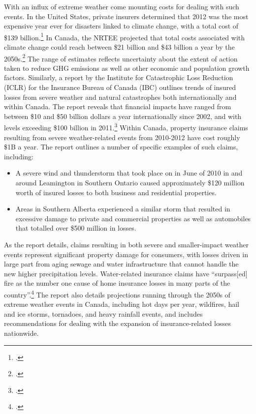 With an influx of extreme weather come mounting costs for dealing with such events. 
In the United States, private insurers determined that 2012 was the most expensive year ever for disasters linked to climate change, with a total cost of \$139 billion.\footcite[][]{BlownAway}
In Canada, the NRTEE projected that total costs associated with climate change could reach between \$21 billion and \$43 billion a year by the 2050s.\footcite[][p.15]{NRTEEPrice}
The range of estimates reflects uncertainty about the extent of action taken to reduce GHG emissions as well as other economic and population growth factors. 
Similarly, a report by the Institute for Catastrophic Loss Reduction (ICLR) for the Insurance Bureau of Canada (IBC) outlines trends of insured losses from severe weather and natural catastrophes both internationally and within Canada. 
The report reveals that financial impacts have ranged from between \$10 and \$50 billion dollars a year internationally since 2002, and with levels exceeding \$100 billion in 2011.\footcite[][p. 5]{TellingWeatherStory}
Within Canada, property insurance claims resulting from severe weather-related events from 2010-2012 have cost roughly \$1B a year.
The report outlines a number of specific examples of such claims, including:
\begin{itemize}
	\item A severe wind and thunderstorm that took place on in June of 2010 in and around Leamington in Southern Ontario caused approximately \$120 million worth of insured losses to both business and residential properties.
	\item Areas in Southern Alberta experienced a similar storm that resulted in excessive damage to private and commercial properties as well as automobiles that totalled over \$500 million in losses.
\end{itemize}
As the report details, claims resulting in both severe and smaller-impact weather events represent significant property damage for consumers, with losses driven in large part from aging sewage and water infrastructure that cannot handle the new higher precipitation levels. Water-related insurance claims have ``surpass[ed] fire as the number one cause of home insurance losses in many parts of the country''.\footcite[][p. 7]{TellingWeatherStory}
The report also details projections running through the 2050s of extreme weather events in Canada, including hot days per year, wildfires, hail and ice storms, tornadoes, and heavy rainfall events, and includes recommendations for dealing with the expansion of insurance-related losses nationwide.



